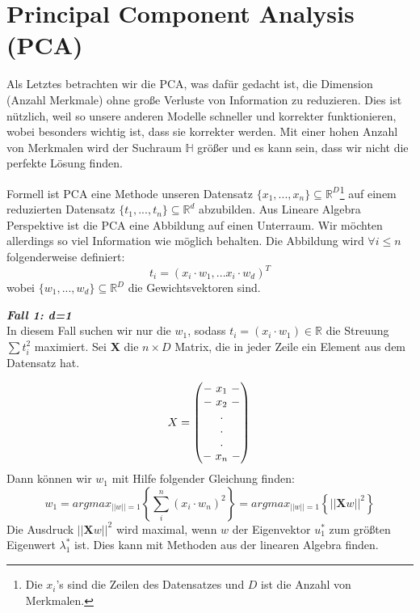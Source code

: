 \section{Principal Component Analysis (PCA)}
Als Letztes betrachten wir die PCA, was dafür gedacht ist, die Dimension (Anzahl Merkmale) ohne große Verluste von Information zu reduzieren. Dies ist nützlich, weil so unsere anderen Modelle schneller und korrekter funktionieren, wobei besonders wichtig ist, dass sie korrekter werden. Mit einer hohen Anzahl von Merkmalen wird der Suchraum $\mathbb{H}$ größer und es kann sein, dass wir nicht die perfekte Lösung finden.

Formell ist PCA eine Methode unseren Datensatz $\{x_1,...,x_n\} \subseteq \mathbb{R}^D$\footnote{Die $x_i$'s sind die Zeilen des Datensatzes und  $D$ ist die Anzahl von Merkmalen. } auf einem reduzierten Datensatz $\{t_1,...,t_n\} \subseteq \mathbb{R}^d$ abzubilden. Aus Lineare Algebra Perspektive ist die PCA eine Abbildung auf einen Unterraum. Wir möchten allerdings  so viel Information wie möglich behalten. Die Abbildung wird $\forall i \leq n$ folgenderweise definiert:
\begin{equation}
    t_i = (x_i \cdot w_1 ,... x_i \cdot w_d)^T
\end{equation}
wobei $\{w_1,...,w_d\} \subseteq \mathbb{R}^D$ die Gewichtsvektoren sind. 

\textbf{\textit{Fall 1: d=1}}\\


In diesem Fall suchen wir nur die $w_1$, sodass $t_i = (x_i \cdot w_1) \in \mathbb{R}$ die  Streuung  $\sum t_i^2$ maximiert. Sei \textbf{X} die $n\times D$ Matrix, die in jeder Zeile ein Element aus dem Datensatz hat.

\begin{equation}
    X = \begin{pmatrix}
        - ~x_1~ -\\
        - ~ x_2 ~ - \\
        .\\.\\.\\
        -~x_n~-
        \end{pmatrix}\\
\end{equation}
Dann können wir $w_1$ mit Hilfe folgender Gleichung finden: 
\begin{equation}
    w_1 = argmax_{||w|| = 1}\left\{ \sum_i^n (x_i\cdot w_n)^2 \right\}= argmax_{||w|| = 1} \left\{||\textbf{X}w||^2\right\}
\end{equation}
Die Ausdruck $||\textbf{X}w||^2$ wird maximal, wenn $w$ der Eigenvektor $u_1^*$ zum größten Eigenwert $\lambda_1^*$ ist. Dies kann mit Methoden aus der linearen Algebra finden. \\

